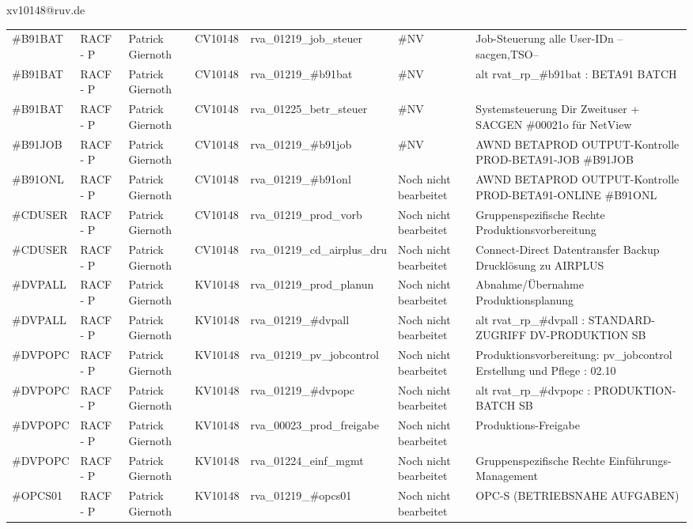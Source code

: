 \documentclass[a4paper,landscape,12pt]{letter}
\begin{document}
\begin{letter}{xv10148@ruv.de\hfill \break}
\begin{tiny}
\begin{longtable}{|p{35mm}|p{15mm}|p{25mm}|p{10mm}|p{40mm}|p{50mm}|p{50mm}|}
\#B91BAT & RACF - P & Patrick Giernoth & CV10148 & rva\_01219\_job\_steuer & \#NV & Job-Steuerung alle User-IDn --sacgen,TSO-- \\
\#B91BAT & RACF - P & Patrick Giernoth & CV10148 & rva\_01219\_\#b91bat & \#NV & alt rvat\_rp\_\#b91bat          : BETA91 BATCH \\
\#B91BAT & RACF - P & Patrick Giernoth & CV10148 & rva\_01225\_betr\_steuer & \#NV & Systemsteuerung Dir Zweituser + SACGEN \#00021o für NetView \\
\#B91JOB & RACF - P & Patrick Giernoth & CV10148 & rva\_01219\_\#b91job & \#NV & AWND BETAPROD OUTPUT-Kontrolle PROD-BETA91-JOB \#B91JOB \\
\#B91ONL & RACF - P & Patrick Giernoth & CV10148 & rva\_01219\_\#b91onl & Noch nicht bearbeitet & AWND BETAPROD OUTPUT-Kontrolle PROD-BETA91-ONLINE \#B91ONL \\
\#CDUSER & RACF - P & Patrick Giernoth & CV10148 & rva\_01219\_prod\_vorb & Noch nicht bearbeitet & Gruppenspezifische Rechte Produktionsvorbereitung \\
\#CDUSER & RACF - P & Patrick Giernoth & CV10148 & rva\_01219\_cd\_airplus\_dru & Noch nicht bearbeitet & Connect-Direct Datentransfer Backup Drucklösung zu AIRPLUS \\
\#DVPALL & RACF - P & Patrick Giernoth & KV10148 & rva\_01219\_prod\_planun & Noch nicht bearbeitet & Abnahme/Übernahme Produktionsplanung \\
\#DVPALL & RACF - P & Patrick Giernoth & KV10148 & rva\_01219\_\#dvpall & Noch nicht bearbeitet & alt rvat\_rp\_\#dvpall          : STANDARD-ZUGRIFF DV-PRODUKTION SB \\
\#DVPOPC & RACF - P & Patrick Giernoth & KV10148 & rva\_01219\_pv\_jobcontrol & Noch nicht bearbeitet & Produktionsvorbereitung: pv\_jobcontrol Erstellung und Pflege : 02.10 \\
\#DVPOPC & RACF - P & Patrick Giernoth & KV10148 & rva\_01219\_\#dvpopc & Noch nicht bearbeitet & alt rvat\_rp\_\#dvpopc          : PRODUKTION-BATCH SB \\
\#DVPOPC & RACF - P & Patrick Giernoth & KV10148 & rva\_00023\_prod\_freigabe & Noch nicht bearbeitet & Produktions-Freigabe \\
\#DVPOPC & RACF - P & Patrick Giernoth & KV10148 & rva\_01224\_einf\_mgmt & Noch nicht bearbeitet & Gruppenspezifische Rechte Einführungs-Management \\
\#OPCS01 & RACF - P & Patrick Giernoth & KV10148 & rva\_01219\_\#opcs01 & Noch nicht bearbeitet & OPC-S (BETRIEBSNAHE AUFGABEN) \\

\end{longtable}
\end{tiny}
\end{letter}
\end{document}
